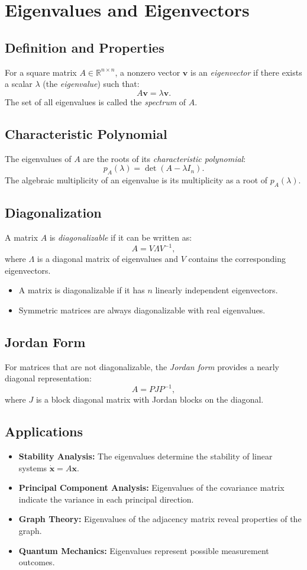 \section{Eigenvalues and Eigenvectors}
\subsection{Definition and Properties}
For a square matrix $A \in \mathbb{R}^{n \times n}$, a nonzero vector $\mathbf{v}$ is an \emph{eigenvector} 
if there exists a scalar $\lambda$ (the \emph{eigenvalue}) such that:
\[
A \mathbf{v} = \lambda \mathbf{v}.
\]
The set of all eigenvalues is called the \emph{spectrum} of $A$.

\subsection{Characteristic Polynomial}
The eigenvalues of $A$ are the roots of its \emph{characteristic polynomial}:
\[
p_A(\lambda) = \det(A - \lambda I_n).
\]
The algebraic multiplicity of an eigenvalue is its multiplicity as a root of $p_A(\lambda)$.

\subsection{Diagonalization}
A matrix $A$ is \emph{diagonalizable} if it can be written as:
\[
A = V \Lambda V^{-1},
\]
where $\Lambda$ is a diagonal matrix of eigenvalues and $V$ contains the corresponding eigenvectors.
\begin{itemize}
    \item A matrix is diagonalizable if it has $n$ linearly independent eigenvectors.
    \item Symmetric matrices are always diagonalizable with real eigenvalues.
\end{itemize}

\subsection{Jordan Form}
For matrices that are not diagonalizable, the \emph{Jordan form} provides a nearly diagonal representation:
\[
A = P J P^{-1},
\]
where $J$ is a block diagonal matrix with Jordan blocks on the diagonal.

\subsection{Applications}
\begin{itemize}
    \item \textbf{Stability Analysis:} 
          The eigenvalues determine the stability of linear systems $\dot{\mathbf{x}} = A \mathbf{x}$.
    \item \textbf{Principal Component Analysis:} 
          Eigenvalues of the covariance matrix indicate the variance in each principal direction.
    \item \textbf{Graph Theory:} 
          Eigenvalues of the adjacency matrix reveal properties of the graph.
    \item \textbf{Quantum Mechanics:} 
          Eigenvalues represent possible measurement outcomes.
\end{itemize} 